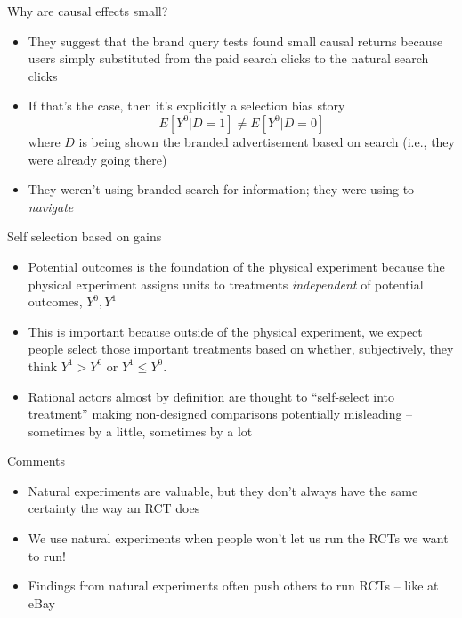 \documentclass{beamer}
\begin{document}
\begin{frame}{Why are causal effects small?}

\begin{itemize}
\item They suggest that the brand query tests found small causal returns because users simply substituted from the paid search clicks to the natural search clicks
\item If that's the case, then it's explicitly a selection bias story $$E[Y^0|D=1] \neq E[Y^0|D=0]$$ where $D$ is being shown the branded advertisement based on search (i.e., they were already going there)
\item They weren't using branded search for information; they were using to \emph{navigate}
\end{itemize}

\end{frame}

\begin{frame}{Self selection based on gains}

\begin{itemize}
\item Potential outcomes is the foundation of the physical experiment because the physical experiment assigns units to treatments \emph{independent} of potential outcomes, $Y^0,Y^1$
\item This is important because outside of the physical experiment, we expect people select those important treatments based on whether, subjectively, they think $Y^1>Y^0$ or $Y^1\leq Y^0$. 
\item Rational actors almost by definition are thought to ``self-select into treatment'' making non-designed comparisons potentially misleading -- sometimes by a little, sometimes by a lot
\end{itemize}

\end{frame}


\begin{frame}{Comments}

\begin{itemize}
\item Natural experiments are valuable, but they don't always have the same certainty the way an RCT does
\item We use natural experiments when people won't let us run the RCTs we want to run!
\item Findings from natural experiments often push others to run RCTs -- like at eBay
\end{itemize}

\end{frame}
\end{document}
